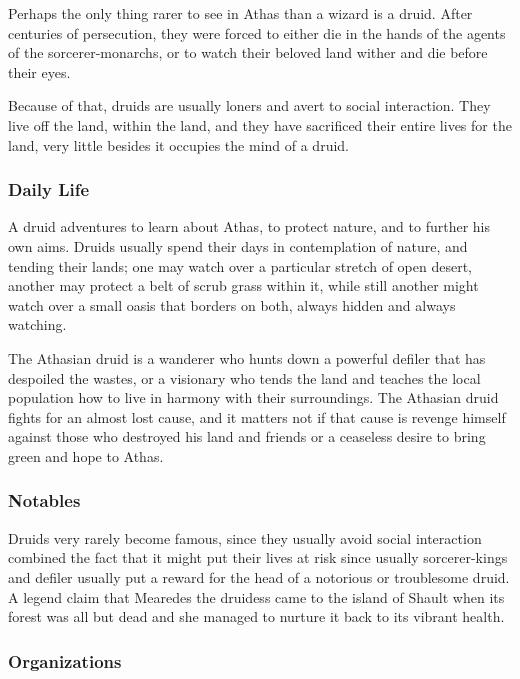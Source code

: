 Perhaps the only thing rarer to see in Athas than a wizard is a druid. After centuries of persecution, they were forced to either die in the hands of the agents of the sorcerer-monarchs, or to watch their beloved land wither and die before their eyes.

Because of that, druids are usually loners and avert to social interaction. They live off the land, within the land, and they have sacrificed their entire lives for the land, very little besides it occupies the mind of a druid.

\subsubsection{Daily Life}

A druid adventures to learn about Athas, to protect nature, and to further his own aims. Druids usually spend their days in contemplation of nature, and tending their lands; one may watch over a particular stretch of open desert, another may protect a belt of scrub grass within it, while still another might watch over a small oasis that borders on both, always hidden and always watching.

The Athasian druid is a wanderer who hunts down a powerful defiler that has despoiled the wastes, or a visionary who tends the land and teaches the local population how to live in harmony with their surroundings. The Athasian druid fights for an almost lost cause, and it matters not if that cause is revenge himself against those who destroyed his land and friends or a ceaseless desire to bring green and hope to Athas.

\subsubsection{Notables}

Druids very rarely become famous, since they usually avoid social interaction combined the fact that it might put their lives at risk since usually sorcerer-kings and defiler usually put a reward for the head of a notorious or troublesome druid. A legend claim that Mearedes the druidess came to the island of Shault when its forest was all but dead and she managed to nurture it back to its vibrant health.

\subsubsection{Organizations}

